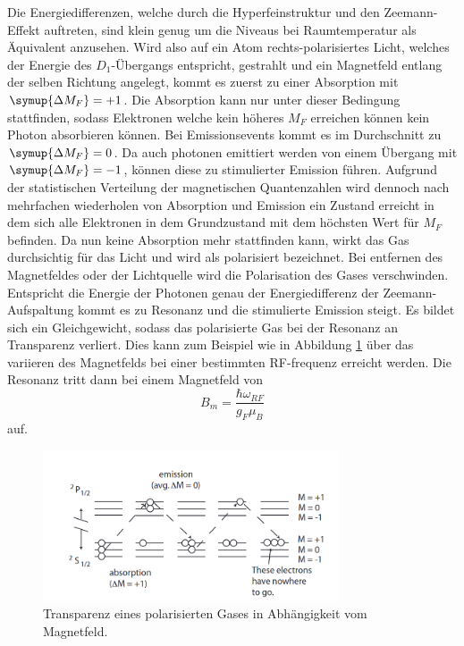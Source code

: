 Die Energiedifferenzen, welche durch die Hyperfeinstruktur und den Zeemann-Effekt auftreten, sind klein genug um die Niveaus bei Raumtemperatur als Äquivalent anzusehen.
Wird also auf ein Atom rechts-polarisiertes Licht, welches der Energie des $D_1$-Übergangs entspricht, gestrahlt und ein Magnetfeld entlang der selben Richtung angelegt, kommt es zuerst zu einer Absorption mit $\symup{\Delta{M_F}} = +1$.
Die Absorption kann nur unter dieser Bedingung stattfinden, sodass Elektronen welche kein höheres $M_F$ erreichen können kein Photon absorbieren können.
Bei Emissionsevents kommt es im Durchschnitt zu $\symup{\Delta{M_F}} = 0$. Da auch photonen emittiert werden von einem Übergang mit $\symup{\Delta{M_F}} = -1$, können diese zu
stimulierter Emission führen. Aufgrund der statistischen Verteilung der magnetischen Quantenzahlen wird dennoch nach mehrfachen wiederholen von Absorption und Emission ein Zustand erreicht
in dem sich alle Elektronen in dem Grundzustand mit dem höchsten Wert für $M_F$ befinden. Da nun keine Absorption mehr stattfinden kann, wirkt das Gas durchsichtig für das Licht und wird als polarisiert bezeichnet.
Bei entfernen des Magnetfeldes oder der Lichtquelle wird die Polarisation des Gases verschwinden. Entspricht die Energie der Photonen genau der Energiedifferenz der Zeemann-Aufspaltung kommt es zu
Resonanz und die stimulierte Emission steigt. Es bildet sich ein Gleichgewicht, sodass das polarisierte Gas bei der Resonanz an Transparenz verliert.
Dies kann zum Beispiel wie in Abbildung \ref{pic:resonanz} über das variieren des Magnetfelds bei einer bestimmten RF-frequenz erreicht werden. Die Resonanz tritt dann bei einem Magnetfeld von 
\begin{equation}
    B_m = \frac{\hbar \omega_{RF}}{g_F \mu_B}
    \label{eqn:magnetf}
\end{equation}
auf.
\begin{figure}
    \centering
    \includegraphics[width = 0.78\textwidth]{pics/pumpen.png}
    \caption{Transparenz eines polarisierten Gases in Abhängigkeit vom Magnetfeld.\cite{sample}}
    \label{pic:resonanz}
\end{figure}



